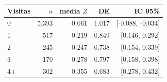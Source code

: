 \begin{tabular}{lrrrr}
\toprule
Visitas & $n$ & media $Z$ & DE & IC 95\% \\
\midrule
0 & 5,393 & -0.061 & 1.017 & [-0.088, -0.034] \\
1 & 517 & 0.219 & 0.849 & [0.146, 0.292] \\
2 & 245 & 0.247 & 0.738 & [0.154, 0.339] \\
3 & 170 & 0.278 & 0.797 & [0.158, 0.398] \\
4+ & 302 & 0.355 & 0.683 & [0.278, 0.432] \\
\bottomrule
\end{tabular}
